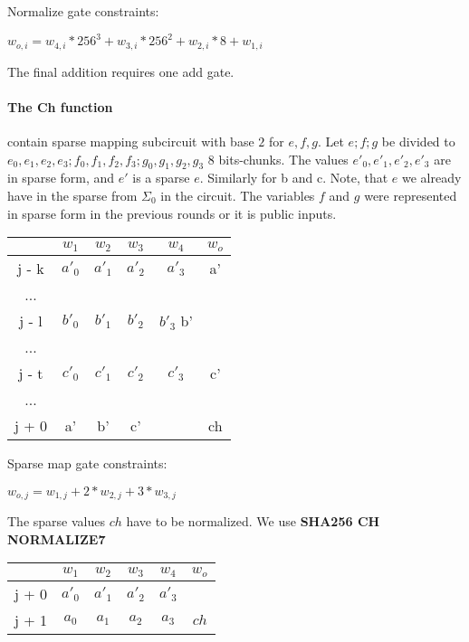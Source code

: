 Normalize gate constraints:
\begin{center}
$w_{o,i} = w_{4,i}*256^3 + w_{3,i}* 256^2 + w_{2,i} * 8 + w_{1,i}$ \\
\end{center}

The final addition requires one add gate.

\paragraph{The Ch function}
contain sparse mapping subcircuit with base $2$ for $e, f ,g$.
Let $e; f; g$ be divided to $e_0, e_1, e_2, e_3; f_0, f_1, f_2, f_3; g_0, g_1, g_2, g_3$ 8 bits-chunks.
The values $e'_0, e'_1, e'_2, e'_3$ are in sparse form, and $e'$ is a sparse $e$.
Similarly for b and c. 
Note, that $e$ we already have in the sparse from $\Sigma_0$ in the circuit. 
The variables $f$ and $g$ were represented in sparse form in the previous rounds or it is public inputs.
\begin{center}
\begin{tabular}{ |c|c|c|c|c|c } 
  & $w_1$ & $w_2$ & $w_3$ & $w_4$ & $w_o$\\ 
 \hline 
j - k & $a'_0$ & $a'_1$ & $a'_2$ & $a'_3$ & a' \\ 
... & & & & \\
j - l & $b'_0$ & $b'_1$ & $b'_2$ & $b'_3$ b'&\\ 
... & & & & \\
j - t & $c'_0$ & $c'_1$ & $c'_2$ & $c'_3$ & c' \\ 
... & & & & \\
j + 0 & a' & b' & c' & & ch\\

 \hline
\end{tabular}
\end{center}
Sparse map gate constraints:
\begin{center}
$w_{o, j} = w_{1,j} + 2*w_{2, j} + 3*w_{3, j}$ \\
\end{center}

The sparse values $ch$ have to be normalized.
We use \textbf{SHA256 CH NORMALIZE7}
\begin{center}
\begin{tabular}{ |c|c|c|c|c|c } 
  & $w_1$ & $w_2$ & $w_3$ & $w_4$ & $w_o$\\ 
 \hline
j + 0 & $a'_0$ & $a'_1$ & $a'_2$ & $a'_3$ &\\ 
j + 1 & $a_0$ & $ a_1$ & $a_2$ & $a_3$ &  $ch$ \\ 
 \hline
\end{tabular}
\end{center}

